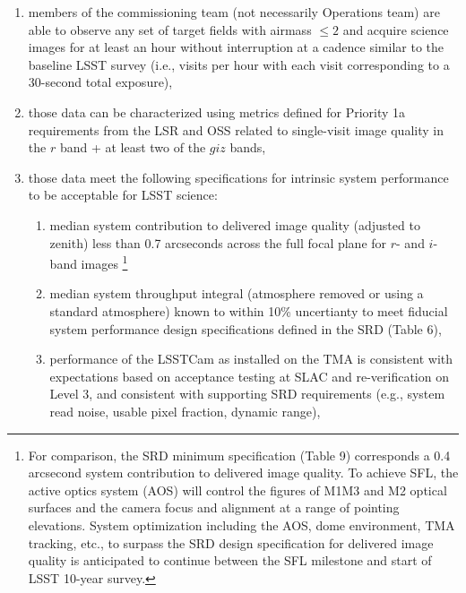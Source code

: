 \documentclass[SE,authoryear,toc,lsstdraft]{lsstdoc}
\begin{document}
\begin{enumerate}
  \item members of the commissioning team (not necessarily Operations team) are able to observe any set of target fields with airmass $\leq 2$ and acquire science images for at least an hour without interruption at a cadence similar to the baseline LSST survey (i.e., visits per hour with each visit corresponding to a 30-second total exposure),
  \item those data can be characterized using metrics defined for Priority 1a requirements from the LSR  and OSS  related to single-visit image quality in the $r$ band + at least two of the $giz$ bands,
  \item those data meet the following specifications for intrinsic system performance to be acceptable for LSST science:
  \begin{enumerate}
    \item median system contribution to delivered image quality (adjusted to zenith) less than 0.7 arcseconds across the full focal plane for $r$- and $i$-band images \footnote{For comparison, the SRD minimum specification (Table 9) corresponds a 0.4 arcsecond system contribution to delivered image quality.
    To achieve SFL, the active optics system (AOS) will control the figures of M1M3 and M2 optical surfaces and the camera focus and alignment at a range of pointing elevations.
    System optimization including the AOS, dome environment, TMA tracking, etc., to surpass the SRD design specification for delivered image quality is anticipated to continue between the SFL milestone and start of LSST 10-year survey.}
    \item median system throughput integral (atmosphere removed or using a standard atmosphere) known to within 10\% uncertianty to meet fiducial system performance design specifications defined in the SRD (Table 6),
    \item performance of the LSSTCam as installed on the TMA is consistent with expectations based on acceptance testing at SLAC and re-verification on Level 3, and consistent with supporting SRD requirements (e.g., system read noise, usable pixel fraction, dynamic range),

\end{enumerate}
\end{enumerate}
\end{document}
